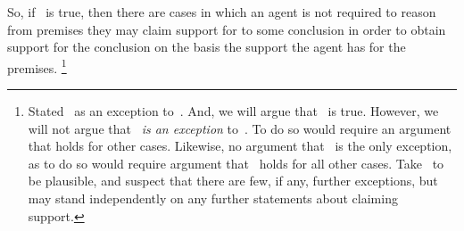 \begin{note}[Alternative]
  So, if~\EAS{} is true, then there are cases in which an agent is not required to reason from premises they may claim support for to some conclusion in order to obtain support for the conclusion on the basis the support the agent has for the premises.\nolinebreak
  \footnote{
    Stated~\EAS{} as an exception to~\ESU{}.
    And, we will argue that~\EAS{} is true.
    However, we will not argue that~\EAS{} \emph{is an exception} to~\ESU{}.
    To do so would require an argument that \ESU{} holds for other cases.
    Likewise, no argument that~\EAS{} is the only exception, as to do so would require argument that~\ESU{} holds for all other cases.
    Take~\ESU{} to be plausible, and suspect that there are few, if any, further exceptions, but~\EAS{} may stand independently on any further statements about claiming support.
  }
\end{note}

